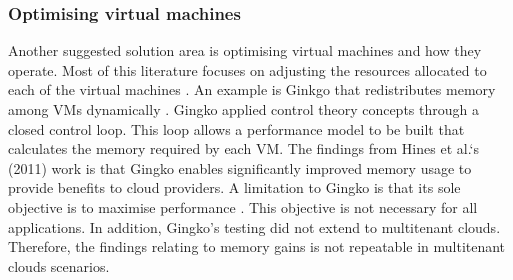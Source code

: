 \subsubsection{Optimising virtual machines}
Another suggested solution area is optimising virtual machines and how
they operate. Most of this literature focuses on adjusting the resources
allocated to each of the virtual machines \cite{sharma2016containers}. An example is Ginkgo that redistributes memory among VMs
dynamically \cite{hines2011applications}. Gingko applied control theory concepts
through a closed control loop. This loop allows a performance model to
be built that calculates the memory required by each VM. The findings
from Hines et al.`s (2011) work is that Gingko enables significantly
improved memory usage to provide benefits to cloud providers.
\newline\newline
A limitation to Gingko is that its sole objective is to maximise
performance \cite{hines2011applications}. This objective is not necessary for
all applications. In addition, Gingko's testing did not extend to multitenant clouds. Therefore, the findings relating to memory gains is
not repeatable in multitenant clouds scenarios.
